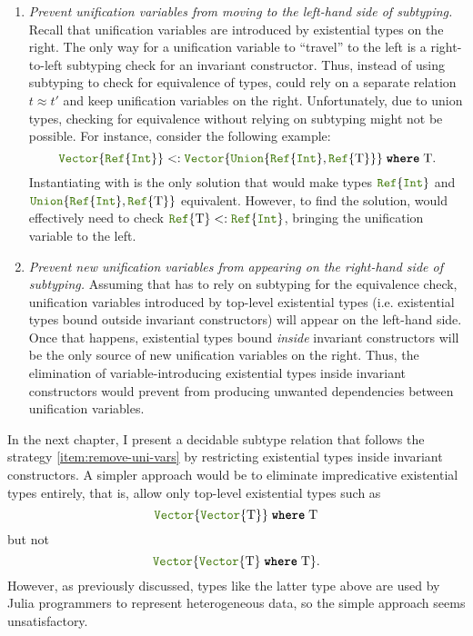 \begin{enumerate}
  \item \emph{Prevent unification variables from moving to the left-hand side
    of subtyping.} Recall that unification variables are introduced by
    existential types on the right. The only way for a unification variable to
    ``travel'' to the left is a right-to-left subtyping check for an
    invariant constructor. Thus, instead of using subtyping to check for
    equivalence of types, \algo could rely on a separate relation
    $t \approx t'$ and keep unification variables on the right.
    Unfortunately, due to union types, checking for equivalence
    without relying on subtyping might not be possible.
    For instance, consider the following example:
    \[
      \vectyp{\reftyp{\inttyp}} 
      <: 
      \wheret{\vectyp{\uniontyp{\reftyp{\inttyp}, \reftyp{\T}}}}{\T}.
    \]
    Instantiating \T with \inttyp is the only solution that would make types
    $\reftyp{\inttyp}$ and $\uniontyp{\reftyp{\inttyp}, \reftyp{\T}}$
    equivalent. However, to find the solution, \algo would effectively need
    to check $\reftyp{\T} <: \reftyp{\inttyp}$, bringing the unification
    variable to the left.
  \item\label{item:remove-uni-vars} 
    \emph{Prevent new unification variables from appearing on the right-hand
    side of subtyping.} Assuming that \algo has to rely on subtyping 
    for the equivalence check, unification variables introduced by top-level
    existential types (i.e. existential types bound outside invariant
    constructors) will appear on the left-hand side. Once that happens,
    existential types bound \emph{inside} invariant constructors will be the
    only source of new unification variables on the right.
    Thus, the elimination of variable-introducing existential types inside 
    invariant constructors would prevent \algo from producing unwanted
    dependencies between unification variables.
\end{enumerate}

In the next chapter, I present a decidable subtype relation that
follows the strategy \ref{item:remove-uni-vars} by restricting
existential types inside invariant constructors.
A simpler approach would be to eliminate impredicative existential types
entirely, that is, allow only top-level existential types such as
\[ \wheret{\vectyp{\vectyp{\T}}}{\T} \]
but not
\[ \vectyp{\wheret{\vectyp{\T}}{\T}}. \]
However, as previously discussed, %
types like the latter  type above are used by Julia programmers 
to represent heterogeneous data, so the simple approach seems unsatisfactory.
